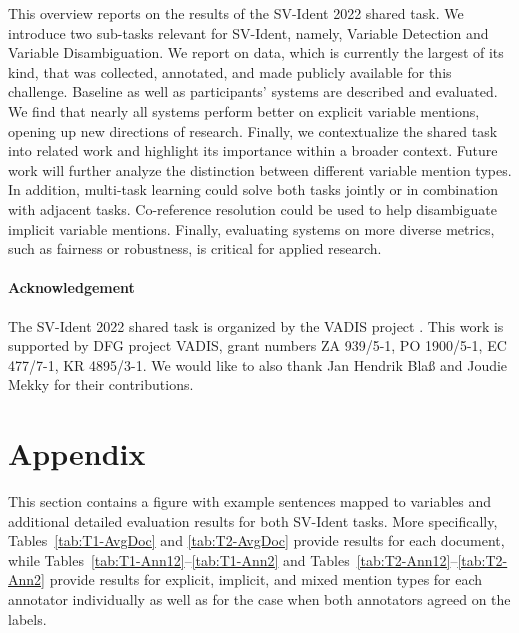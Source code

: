 \documentclass[11pt]{article}
\begin{document}
This overview reports on the results of the SV-Ident 2022 shared task.
We introduce two sub-tasks relevant for SV-Ident, namely, Variable Detection and Variable Disambiguation.
We report on data, which is currently the largest of its kind, that was collected, annotated, and made publicly available for this challenge.
Baseline as well as participants' systems are described and evaluated.
We find that nearly all systems perform better on explicit variable mentions, opening up new directions of research.
Finally, we contextualize the shared task into related work and highlight its importance within a broader context.
Future work will further analyze the distinction between different variable mention types.
In addition, multi-task learning could solve both tasks jointly or in combination with adjacent tasks.
Co-reference resolution could be used to help disambiguate implicit variable mentions.
Finally, evaluating systems on more diverse metrics, such as fairness or robustness, is critical for applied research.

\paragraph{Acknowledgement}
The SV-Ident 2022 shared task is organized by the VADIS project \cite{kartal2022}. This work is supported by DFG project VADIS, grant numbers ZA 939/5-1, PO 1900/5-1, EC 477/7-1, KR 4895/3-1. 
We would like to also thank Jan Hendrik Blaß and Joudie Mekky for their contributions.





\appendix
\section*{Appendix}
\label{sec:appendix}
This section contains a figure with example sentences mapped to variables and additional detailed evaluation results for both SV-Ident tasks.
More specifically, Tables~\ref{tab:T1-AvgDoc} and \ref{tab:T2-AvgDoc} provide results for each document, while Tables~\ref{tab:T1-Ann12}--\ref{tab:T1-Ann2} and Tables~\ref{tab:T2-Ann12}--\ref{tab:T2-Ann2} provide results for explicit, implicit, and mixed mention types for each annotator individually as well as for the case when both annotators agreed on the labels.
\end{document}
